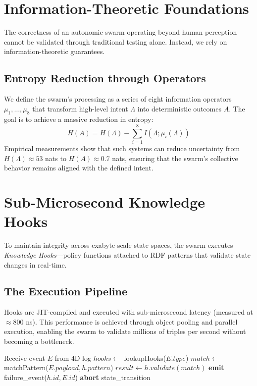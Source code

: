 \section{Information-Theoretic Foundations}

The correctness of an autonomic swarm operating beyond human perception cannot be validated through traditional testing alone. Instead, we rely on information-theoretic guarantees.

\subsection{Entropy Reduction through Operators}
We define the swarm's processing as a series of eight information operators $\mu_1, \ldots, \mu_8$ that transform high-level intent $\Lambda$ into deterministic outcomes $A$. The goal is to achieve a massive reduction in entropy:
\begin{equation}
H(A) = H(\Lambda) - \sum_{i=1}^{8} I(\Lambda; \mu_i(\Lambda))
\end{equation}
Empirical measurements show that such systems can reduce uncertainty from $H(\Lambda) \approx 53$ nats to $H(A) \approx 0.7$ nats, ensuring that the swarm's collective behavior remains aligned with the defined intent.

\section{Sub-Microsecond Knowledge Hooks}

To maintain integrity across exabyte-scale state spaces, the swarm executes \textit{Knowledge Hooks}—policy functions attached to RDF patterns that validate state changes in real-time.

\subsection{The Execution Pipeline}
Hooks are JIT-compiled and executed with sub-microsecond latency (measured at $\approx 800$ ns). This performance is achieved through object pooling and parallel execution, enabling the swarm to validate millions of triples per second without becoming a bottleneck.

\begin{algorithm}
\caption{Swarm Hook Execution}
\begin{algorithmic}
  \State Receive event $E$ from 4D log
  \State $hooks \gets$ lookupHooks($E.type$)
  \State {}
    \State $match \gets$ matchPattern($E.payload, h.pattern$)
      \State $result \gets h.validate(match)$
        \State \textbf{emit} failure\_event($h.id, E.id$)
        \State \textbf{abort} state\_transition
      \EndIf
    \EndIf
  \EndFor
\end{algorithmic}
\end{algorithm}

